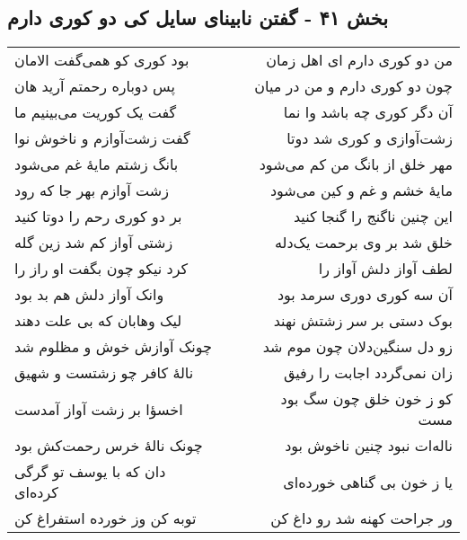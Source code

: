 \begin{center}
\section*{بخش ۴۱ - گفتن نابینای سایل کی دو کوری دارم}
\label{sec:sh041}
\begin{longtable}{l p{0.5cm} r}
بود کوری کو همی‌گفت الامان
&&
من دو کوری دارم ای اهل زمان
\\
پس دوباره رحمتم آرید هان
&&
چون دو کوری دارم و من در میان
\\
گفت یک کوریت می‌بینیم ما
&&
آن دگر کوری چه باشد وا نما
\\
گفت زشت‌آوازم و ناخوش نوا
&&
زشت‌آوازی و کوری شد دوتا
\\
بانگ زشتم مایهٔ غم می‌شود
&&
مهر خلق از بانگ من کم می‌شود
\\
زشت آوازم بهر جا که رود
&&
مایهٔ خشم و غم و کین می‌شود
\\
بر دو کوری رحم را دوتا کنید
&&
این چنین ناگنج را گنجا کنید
\\
زشتی آواز کم شد زین گله
&&
خلق شد بر وی برحمت یک‌دله
\\
کرد نیکو چون بگفت او راز را
&&
لطف آواز دلش آواز را
\\
وانک آواز دلش هم بد بود
&&
آن سه کوری دوری سرمد بود
\\
لیک وهابان که بی علت دهند
&&
بوک دستی بر سر زشتش نهند
\\
چونک آوازش خوش و مظلوم شد
&&
زو دل سنگین‌دلان چون موم شد
\\
نالهٔ کافر چو زشتست و شهیق
&&
زان نمی‌گردد اجابت را رفیق
\\
اخسؤا بر زشت آواز آمدست
&&
کو ز خون خلق چون سگ بود مست
\\
چونک نالهٔ خرس رحمت‌کش بود
&&
ناله‌ات نبود چنین ناخوش بود
\\
دان که با یوسف تو گرگی کرده‌ای
&&
یا ز خون بی گناهی خورده‌ای
\\
توبه کن وز خورده استفراغ کن
&&
ور جراحت کهنه شد رو داغ کن
\\
\end{longtable}
\end{center}

